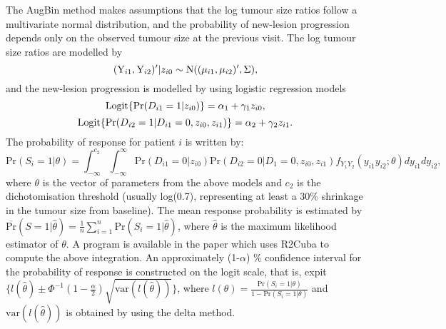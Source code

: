 \documentclass[10pt,A4]{article}
\begin{document}
The AugBin method makes assumptions that the log tumour size ratios follow a multivariate normal distribution, and the probability of new-lesion progression depends only on the observed tumour size at the previous visit. The log tumour size ratios are modelled by
\[
(\text{Y}_{i1}, \text{Y}_{i2})'|z_{i0} \sim \hbox{N}((\mu_{i1}, \mu_{i2})',\Sigma),
\]
and the new-lesion progression is modelled by using logistic regression models
\[
\hbox{Logit}\{\text{Pr}(D_{i1}=1|z_{i0})\}=\alpha_1+\gamma_1z_{i0},
\]
\[
\hbox{Logit}\{\text{Pr}(D_{i2}=1|D_{i1}=0,z_{i0},z_{i1})\}=\alpha_2+\gamma_2z_{i1}.
\]
The probability of response for patient $i$ is written by:
\[
\text{Pr}(S_i=1|\theta)=\int_{-\infty}^{c_2}\int_{-\infty}^{\infty}\text{Pr}(D_{i1}=0|z_{i0})\text{Pr}(D_{i2}=0|D_1=0,z_{i0},z_{i1})f_{Y_1Y_2}(y_{i1}y_{i2};\theta)dy_{i1}dy_{i2},
\]
where $\theta$ is the vector of parameters from the above models and $c_2$ is the dichotomisation threshold (usually log(0.7), representing at least a 30$\%$ shrinkage in the tumour size from baseline). The mean response probability is estimated by $\overline{\text{Pr}}(S=1|\hat{\theta})=\frac{1}{n}\sum_{i=1}^{n}\text{Pr}(S_i=1|\hat{\theta})$, where $\hat{\theta}$ is the maximum likelihood estimator of $\theta$. A program  is available in the paper which uses R2Cuba to compute the above integration. An approximately (1-$\alpha$) \%  confidence interval for the probability of response is constructed on the logit scale, that is, expit$\bigg\{l(\hat{\theta})\pm \Phi^{-1}(1-\frac{\alpha}{2})\sqrt{\text{var}(l(\hat{\theta}))}\bigg\}$, where $l(\theta)=\frac{\text{Pr}(S_i=1|\theta)}{1-\text{Pr}(S_i=1|\theta)}$ and $\text{var}(l(\hat{\theta}))$ is obtained by using the delta method.
\end{document}
